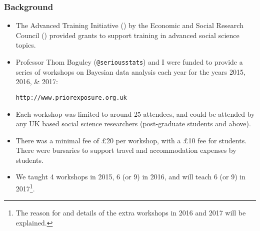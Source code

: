 \begin{frame}
	\frametitle{Background}

	\begin{itemize}

		\item The Advanced Training Initiative (\ati) by the Economic
			and Social Research Council (\esrc) provided grants to
			support training in advanced social science topics.

		\item Professor Thom Baguley (\faTwitter \texttt{@seriousstats})  and I were funded to provide a series of workshops on Bayesian data analysis each year for the years 2015, 2016, \& 2017:\\
			{\begin{center}\texttt{http://www.priorexposure.org.uk}\end{center}}

		\item Each workshop was limited to around 25 attendees, and could be attended by any UK based social science researchers (post-graduate students and above).

		\item There was a minimal fee of \pounds20 per workshop, with a \pounds10 fee for students. There were bursaries to support travel and accommodation expenses by students.

		\item We taught 4 workshops in 2015, 6 (or 9) in 2016, and will teach 6 (or 9) in 2017\footnote{The reason for and details of the extra workshops in 2016 and 2017 will be explained.}.

	\end{itemize}

\end{frame}
